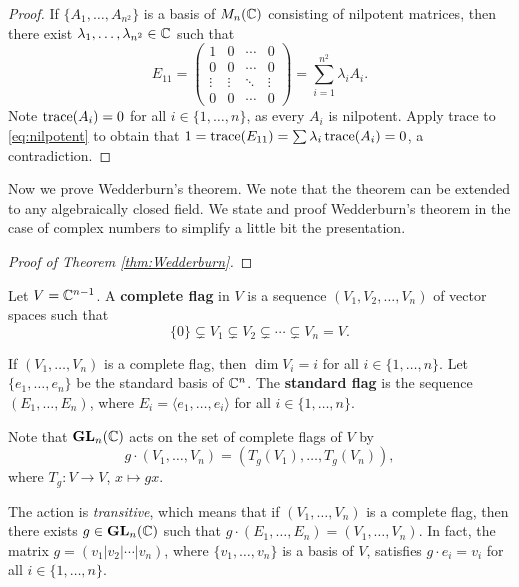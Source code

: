 \begin{proof}
    If $\{A_1,\dots,A_{n^2}\}$ is a basis of 
    $M_n(\mathbb{C})$ consisting of nilpotent matrices, 
    then there exist $\lambda_1,\dots,\lambda_{n^2}\in\mathbb{C}$ such that 
    \begin{equation}
        \label{eq:nilpotent}
        E_{11}=\begin{pmatrix}
        1&0&\cdots&0\\
        0&0&\cdots&0\\
        \vdots&\vdots&\ddots&\vdots\\
        0&0&\cdots&0
        \end{pmatrix}
        =\sum_{i=1}^{n^2}\lambda_iA_i.
    \end{equation}
    Note $\operatorname{trace}(A_i)=0$ for all $i\in\{1,\dots,n\}$, as 
    every $A_i$ is nilpotent. 
    Apply trace to \eqref{eq:nilpotent} to 
    obtain that $1=\operatorname{trace}(E_{11})=\sum\lambda_i\operatorname{trace}(A_i)=0$, a contradiction. 
\end{proof}

Now we prove Wedderburn's theorem. We note that
the theorem can be extended to any algebraically closed field. We 
state and proof Wedderburn's theorem in the case of complex numbers
to simplify a little bit the presentation. 

\begin{proof}[Proof of Theorem \ref{thm:Wedderburn}]
    
\end{proof}

\begin{definition}
    Let $V=\mathbb{C}^{n-1}$. A \textbf{complete flag} in $V$ 
    is a sequence $(V_1,V_2,\dots,V_n)$ of vector spaces
    such that 
    \[
    \{0\}\subsetneq V_1\subsetneq V_2\subsetneq\cdots\subsetneq V_n=V.
    \]
\end{definition}

If $(V_1,\dots,V_n)$ is a complete flag, then $\dim V_i=i$ for all 
$i\in\{1,\dots,n\}$. 
Let $\{e_1,\dots,e_n\}$ be the standard basis of $\mathbb{C}^n$. 
The \textbf{standard flag} is the sequence $(E_1,\dots,E_n)$, where
$E_i=\langle e_1,\dots,e_i\rangle$ for all $i\in\{1,\dots,n\}$.  

Note that $\mathbf{GL}_n(\mathbb{C})$ acts on the set of complete flags of $V$ 
by 
\[
g\cdot (V_1,\dots,V_n)=(T_g(V_1),\dots,T_g(V_n)),
\]
where $T_g\colon V\to V$, $x\mapsto gx$. 

The action is \emph{transitive}, 
which means that if $(V_1,\dots,V_n)$ 
is a complete flag, then there exists 
$g\in\mathbf{GL}_n(\mathbb{C})$ such that $g\cdot (E_1,\dots,E_n)=(V_1,\dots,V_n)$. 
In fact, 
the matrix $g=(v_1|v_2|\cdots|v_n)$, where
$\{v_1,\dots,v_n\}$ is a basis of $V$, 
satisfies $g\cdot e_i=v_i$ for all $i\in\{1,\dots,n\}$. 


